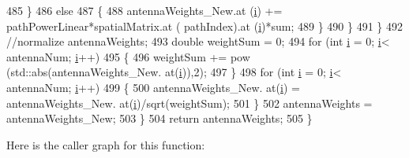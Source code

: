 \begin{DoxyCode}
485                                 \}
486                                 \textcolor{keywordflow}{else}
487                                 \{
488                                         antennaWeights\_New.at (\hyperlink{bernuolliDistribution_8m_a6f6ccfcf58b31cb6412107d9d5281426}{i}) += pathPowerLinear*spatialMatrix.at (
      pathIndex).at (\hyperlink{bernuolliDistribution_8m_a6f6ccfcf58b31cb6412107d9d5281426}{i})*sum;
489                                 \}
490                         \}
491                 \}
492                 \textcolor{comment}{//normalize antennaWeights;}
493                 \textcolor{keywordtype}{double} weightSum = 0;
494                 \textcolor{keywordflow}{for} (\textcolor{keywordtype}{int} \hyperlink{bernuolliDistribution_8m_a6f6ccfcf58b31cb6412107d9d5281426}{i} = 0; \hyperlink{bernuolliDistribution_8m_a6f6ccfcf58b31cb6412107d9d5281426}{i}< antennaNum; \hyperlink{bernuolliDistribution_8m_a6f6ccfcf58b31cb6412107d9d5281426}{i}++)
495                 \{
496                         weightSum += pow (std::abs(antennaWeights\_New. at(\hyperlink{bernuolliDistribution_8m_a6f6ccfcf58b31cb6412107d9d5281426}{i})),2);
497                 \}
498                 \textcolor{keywordflow}{for} (\textcolor{keywordtype}{int} \hyperlink{bernuolliDistribution_8m_a6f6ccfcf58b31cb6412107d9d5281426}{i} = 0; \hyperlink{bernuolliDistribution_8m_a6f6ccfcf58b31cb6412107d9d5281426}{i}< antennaNum; \hyperlink{bernuolliDistribution_8m_a6f6ccfcf58b31cb6412107d9d5281426}{i}++)
499                 \{
500                         antennaWeights\_New. at(\hyperlink{bernuolliDistribution_8m_a6f6ccfcf58b31cb6412107d9d5281426}{i}) = antennaWeights\_New. at(\hyperlink{bernuolliDistribution_8m_a6f6ccfcf58b31cb6412107d9d5281426}{i})/sqrt(weightSum);
501                 \}
502                 antennaWeights = antennaWeights\_New;
503         \}
504         \textcolor{keywordflow}{return} antennaWeights;
505 \}
\end{DoxyCode}


Here is the caller graph for this function\+:


